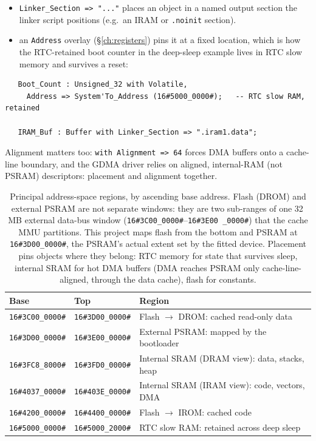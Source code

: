 \begin{itemize}
  \item \texttt{Linker\_Section => "..."} places an object in a named output
        section the linker script positions (e.g.\ an IRAM or \texttt{.noinit}
        section).
  \item an \texttt{Address} overlay (\S\ref{ch:registers}) pins it at a fixed
        location, which is how the RTC-retained boot counter in the deep-sleep
        example lives in RTC slow memory and survives a reset:
\end{itemize}

\begin{lstlisting}
   Boot_Count : Unsigned_32 with Volatile,
     Address => System'To_Address (16#5000_0000#);   -- RTC slow RAM, retained

   IRAM_Buf : Buffer with Linker_Section => ".iram1.data";
\end{lstlisting}

Alignment matters too: \texttt{with Alignment => 64} forces DMA buffers onto a
cache-line boundary, and the GDMA driver relies on aligned, internal-RAM (not
PSRAM) descriptors: placement and alignment together.

\begin{table}[ht]
\centering
\begin{tabular}{@{}l l l@{}}
\toprule
\textbf{Base} & \textbf{Top} & \textbf{Region} \\ \midrule
\texttt{16\#3C00\_0000\#} & \texttt{16\#3D00\_0000\#} & Flash $\to$ DROM: cached read-only data \\
\texttt{16\#3D00\_0000\#} & \texttt{16\#3E00\_0000\#} & External PSRAM: mapped by the bootloader \\
\texttt{16\#3FC8\_8000\#} & \texttt{16\#3FD0\_0000\#} & Internal SRAM (DRAM view): data, stacks, heap \\
\texttt{16\#4037\_0000\#} & \texttt{16\#403E\_0000\#} & Internal SRAM (IRAM view): code, vectors, DMA \\
\texttt{16\#4200\_0000\#} & \texttt{16\#4400\_0000\#} & Flash $\to$ IROM: cached code \\
\texttt{16\#5000\_0000\#} & \texttt{16\#5000\_2000\#} & RTC slow RAM: retained across deep sleep \\
\bottomrule
\end{tabular}
\caption{Principal address-space regions, by ascending base address. Flash
(DROM) and external PSRAM are not separate windows: they are two sub-ranges of
one 32\,MB external data-bus window (\texttt{16\#3C00\_0000\#}--\texttt{16\#3E00%
\_0000\#}) that the cache MMU partitions. This project maps flash from the
bottom and PSRAM at \texttt{16\#3D00\_0000\#}, the PSRAM's actual extent set by
the fitted device. Placement pins objects where they belong: RTC memory for
state that survives sleep, internal SRAM for hot DMA buffers (DMA reaches PSRAM
only cache-line-aligned, through the data cache), flash for constants.}
\label{tab:memmap}
\end{table}

